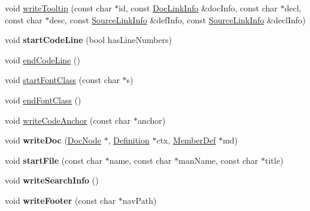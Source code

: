 \begin{DoxyCompactItemize}
\item 
void \mbox{\hyperlink{class_docbook_generator_a86c6e83addf31b0c377fbe6ecab97769}{write\+Tooltip}} (const char $\ast$id, const \mbox{\hyperlink{struct_doc_link_info}{Doc\+Link\+Info}} \&doc\+Info, const char $\ast$decl, const char $\ast$desc, const \mbox{\hyperlink{struct_source_link_info}{Source\+Link\+Info}} \&def\+Info, const \mbox{\hyperlink{struct_source_link_info}{Source\+Link\+Info}} \&decl\+Info)
\item 
\mbox{\label{class_docbook_generator_a08551a6c7ec1d06ec874880a1d10df5b}} 
void {\bfseries start\+Code\+Line} (bool has\+Line\+Numbers)
\item 
void \mbox{\hyperlink{class_docbook_generator_a8f7445243e87fede91ba577d5549b907}{end\+Code\+Line}} ()
\item 
void \mbox{\hyperlink{class_docbook_generator_a899bafb067d2ad8cf7d834e23af83d91}{start\+Font\+Class}} (const char $\ast$s)
\item 
void \mbox{\hyperlink{class_docbook_generator_a857d641f5f3894a4053037e842d45a10}{end\+Font\+Class}} ()
\item 
void \mbox{\hyperlink{class_docbook_generator_a7fc22eda4420a580d40a7fa2624209b6}{write\+Code\+Anchor}} (const char $\ast$anchor)
\item 
\mbox{\label{class_docbook_generator_a1a9ec2c9ed95cc3c05c5e08b66e1979c}} 
void {\bfseries write\+Doc} (\mbox{\hyperlink{class_doc_node}{Doc\+Node}} $\ast$, \mbox{\hyperlink{class_definition}{Definition}} $\ast$ctx, \mbox{\hyperlink{class_member_def}{Member\+Def}} $\ast$md)
\item 
\mbox{\label{class_docbook_generator_a84bcc7d0ce461e096b42e95f32631a66}} 
void {\bfseries start\+File} (const char $\ast$name, const char $\ast$man\+Name, const char $\ast$title)
\item 
\mbox{\label{class_docbook_generator_a15970f9de0fede32a614b46f23b2a401}} 
void {\bfseries write\+Search\+Info} ()
\item 
\mbox{\label{class_docbook_generator_a371c487bb4bfb47558dbd49d6284af53}} 
void {\bfseries write\+Footer} (const char $\ast$nav\+Path)
\item 
\mbox{\label{class_docbook_generator_a804adfd616ba87edb4a2cbb988601134}} 

\end{DoxyCompactItemize}
